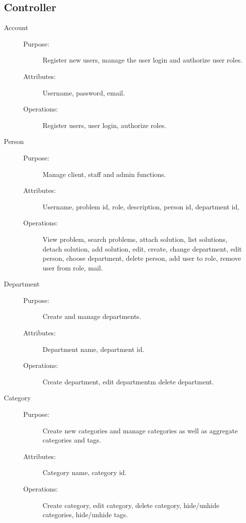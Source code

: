 \subsection{Controller}

\begin{description}
\item[Account]\hfill
\begin{description}
\item[Purpose:]Register new users, manage the user login and authorize user roles.
\item[Attributes:] Username, password, email.
\item[Operations:]Register users, user login, authorize roles.
\end{description}
\end{description}

\begin{description}
\item[Person]\hfill
\begin{description}
\item[Purpose:]Manage client, staff and admin functions.
\item[Attributes:] Username, problem id, role, description, person id, department id, 
\item[Operations:]View problem, search problems, attach solution, list solutions, detach solution, add solution, edit, create, change department, edit person, choose department, delete person, add user to role, remove user from role, mail.
\end{description}
\end{description}

\begin{description}
\item[Department]\hfill
\begin{description}
\item[Purpose:]Create and manage departments.
\item[Attributes:]Department name, department id.
\item[Operations:]Create department, edit departmentm delete department.
\end{description}
\end{description}

\begin{description}
\item[Category]\hfill
\begin{description}
\item[Purpose:]Create new categories and manage categories as well as aggregate categories and tags.
\item[Attributes:]Category name, category id.
\item[Operations:]Create category, edit category, delete category, hide/unhide categories, hide/unhide tags.
\end{description}
\end{description}

